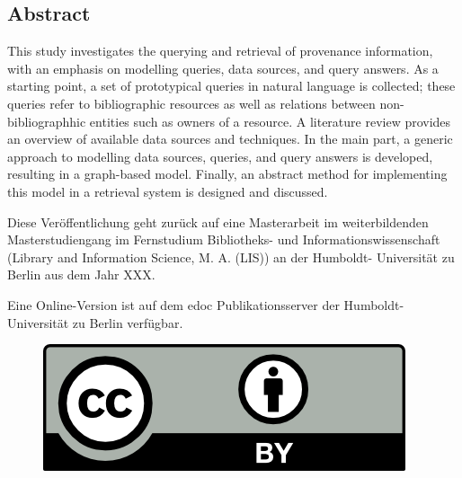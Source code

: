 \vspace*{\fill}
\subsection*{\textrm{Abstract}}
This study investigates the querying and retrieval of provenance information,
with an emphasis on modelling queries, data sources, and query answers.
As a starting point, a set of prototypical queries in natural language is collected;
these queries refer to bibliographic resources as well as relations between non-bibliographhic entities such as owners
of a resource. 
A literature review provides an overview of available data sources and techniques.
In the main part, a generic approach to modelling data sources,
queries, and query answers is developed, resulting in a graph-based model.
Finally, an abstract method for implementing this model in a retrieval system is designed and discussed.


\vspace*{\fill}
Diese Veröffentlichung geht zurück auf eine Masterarbeit im weiterbildenden Ma\-ster\-stu\-di\-en\-gang im Fernstudium Bibliotheks- und Informationswissenschaft (\foreignlanguage{english}{Library and Information Science}, M. A. (LIS)) an der Humboldt- Universität zu Berlin aus dem Jahr XXX.\par
%
%
%
%
Eine Online-Version ist auf dem edoc Publikationsserver der Humboldt-Universität zu Berlin verfügbar. \par

\begin{figure}
\vspace{-.481cm}
\includegraphics[scale=.7]{BHR_template/by.png}
\end{figure}

